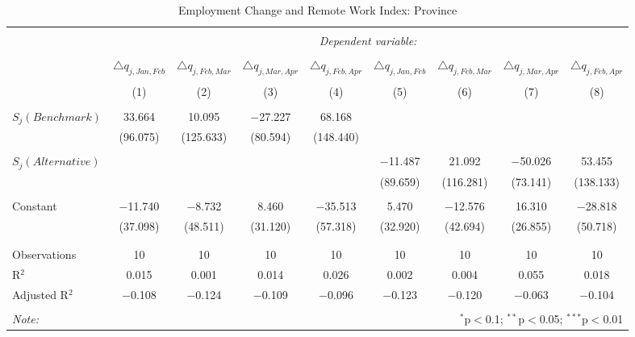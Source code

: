 
\begin{table}[!htbp] \centering 
  \caption{Employment Change and Remote Work Index: Province} 
  \label{tab:regression_dynamics_province} 
\footnotesize 
\begin{tabular}{@{\extracolsep{5pt}}lcccccccc} 
\\[-1.8ex]\hline 
\hline \\[-1.8ex] 
 & \multicolumn{8}{c}{\textit{Dependent variable:}} \\ 
\cline{2-9} 
\\[-1.8ex] & $\triangle q_{j,Jan,Feb}$ & $\triangle q_{j,Feb,Mar}$ & $\triangle q_{j,Mar,Apr}$ & $\triangle q_{j,Feb,Apr}$ & $\triangle q_{j,Jan,Feb}$ & $\triangle q_{j,Feb,Mar}$ & $\triangle q_{j,Mar,Apr}$ & $\triangle q_{j,Feb,Apr}$ \\ 
\\[-1.8ex] & (1) & (2) & (3) & (4) & (5) & (6) & (7) & (8)\\ 
\hline \\[-1.8ex] 
 $S_{j}(Benchmark)$ & 33.664 & 10.095 & $-$27.227 & 68.168 &  &  &  &  \\ 
  & (96.075) & (125.633) & (80.594) & (148.440) &  &  &  &  \\ 
  & & & & & & & & \\ 
 $S_{j}(Alternative)$ &  &  &  &  & $-$11.487 & 21.092 & $-$50.026 & 53.455 \\ 
  &  &  &  &  & (89.659) & (116.281) & (73.141) & (138.133) \\ 
  & & & & & & & & \\ 
 Constant & $-$11.740 & $-$8.732 & 8.460 & $-$35.513 & 5.470 & $-$12.576 & 16.310 & $-$28.818 \\ 
  & (37.098) & (48.511) & (31.120) & (57.318) & (32.920) & (42.694) & (26.855) & (50.718) \\ 
  & & & & & & & & \\ 
\hline \\[-1.8ex] 
Observations & 10 & 10 & 10 & 10 & 10 & 10 & 10 & 10 \\ 
R$^{2}$ & 0.015 & 0.001 & 0.014 & 0.026 & 0.002 & 0.004 & 0.055 & 0.018 \\ 
Adjusted R$^{2}$ & $-$0.108 & $-$0.124 & $-$0.109 & $-$0.096 & $-$0.123 & $-$0.120 & $-$0.063 & $-$0.104 \\ 
\hline 
\hline \\[-1.8ex] 
\textit{Note:}  & \multicolumn{8}{r}{$^{*}$p$<$0.1; $^{**}$p$<$0.05; $^{***}$p$<$0.01} \\ 
\end{tabular} 
\end{table} 
